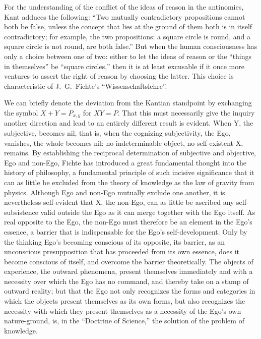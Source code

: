 \documentclass[12pt]{article}
\begin{document}
For the understanding of the conflict of the ideas of reason in the
antinomies, Kant adduces the following: ``Two mutually contradictory
propositions cannot both be false, unless the concept that lies
at the ground of them both is in itself contradictory; for example, the two
propositions: a square circle is round, and a square circle is not round,
are both false.'' But when the human consciousness has only a choice
between one of two: either to let the ideas of reason or the ``things in
themselves'' be ``square circles,'' then it is at least excusable if it once
more ventures to assert the right of reason by choosing the latter. This
choice is characteristic of J.\ G.\ Fichte's ``Wissenschaftslehre''.

We can briefly denote the deviation from the Kantian standpoint by
exchanging the symbol $X + Y = P_{x,y}$ for $XY = P$. That this must
necessarily give the inquiry another direction and lead to an entirely
different result is evident. When Y, the subjective, becomes nil, that is,
when the cognizing subjectivity, the Ego, vanishes, the whole becomes nil:
no indeterminable object, no self-existent X, remains. By establishing the
reciprocal determination of subjective and objective, Ego and non-Ego,
Fichte has introduced a great fundamental thought into the history of
philosophy, a fundamental principle of such incisive significance that it
can as little be excluded from the theory of knowledge as the law of
gravity from physics. Although Ego and non-Ego mutually exclude one
another, it is nevertheless self-evident that X, the non-Ego, can as little
be ascribed any self-subsistence valid outside the Ego as it can merge
together with the Ego itself. As real opposite to the Ego, the non-Ego must
therefore be an element in the Ego's essence, a barrier that is
indispensable for the Ego's self-development. Only by the thinking Ego's
becoming conscious of its opposite, its barrier, as an unconscious
presupposition that has proceeded from its own essence, does it become
conscious of itself, and overcome the barrier theoretically. The objects of
experience, the outward phenomena, present themselves immediately and with
a necessity over which the Ego has no command, and thereby take on a stamp
of outward reality; but that the Ego not only recognizes the forms and
categories in which the objects present themselves as its own forms, but
also recognizes the necessity with which
they present themselves as a necessity of the Ego's own nature-ground, is,
in the ``Doctrine of Science,'' the solution of the problem of knowledge.
\end{document}
